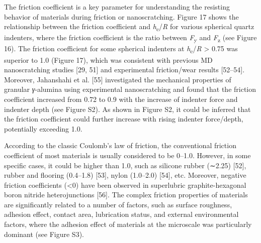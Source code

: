 \documentclass{article}
\begin{document}
The friction coefficient is a key parameter for understanding the resisting behavior of materials during friction or nanoscratching. Figure 17 shows the relationship between the friction coefficient and \emph{h}\textsubscript{c}/\emph{R} for various spherical quartz indenters, where the friction coefficient is the ratio between \emph{F}\textsubscript{y} and \emph{F}\textsubscript{z} (see Figure 16). The friction coefficient for some spherical indenters at \emph{h}\textsubscript{c}/\emph{R} > 0.75 was superior to 1.0 (Figure 17), which was consistent with previous MD nanoscratching studies [29, 51] and experimental friction/wear results [52–54]. Moreover, Jahanshahi et al. [55] investigated the mechanical properties of granular \emph{γ}-alumina using experimental nanoscratching and found that the friction coefficient increased from 0.72 to 0.9 with the increase of indenter force and indenter depth (see Figure S2). As shown in Figure S2, it could be inferred that the friction coefficient could further increase with rising indenter force/depth, potentially exceeding 1.0.

According to the classic Coulomb’s law of friction, the conventional friction coefficient of most materials is usually considered to be 0–1.0. However, in some specific cases, it could be higher than 1.0, such as silicone rubber (∼2.25) [52], rubber and flooring (0.4–1.8) [53], nylon (1.0–2.0) [54], etc. Moreover, negative friction coefficients (<0) have been observed in superlubric graphite-hexagonal boron nitride heterojunctions [56]. The complex friction properties of materials are significantly related to a number of factors, such as surface roughness, adhesion effect, contact area, lubrication status, and external environmental factors, where the adhesion effect of materials at the microscale was particularly dominant (see Figure S3).
\end{document}
